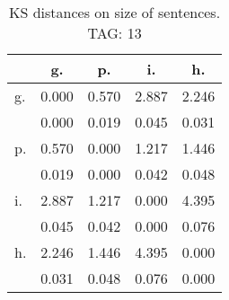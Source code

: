 \begin{table}[h!]
\begin{center}
\begin{tabular}{| l | c | c | c | c |}\hline
 & g. & p. & i. & h. \\\hline
g. & 0.000  & 0.570  & 2.887  & 2.246 \\\hline
 & 0.000  & 0.019  & 0.045  & 0.031 \\\hline
p. & 0.570  & 0.000  & 1.217  & 1.446 \\\hline
 & 0.019  & 0.000  & 0.042  & 0.048 \\\hline
i. & 2.887  & 1.217  & 0.000  & 4.395 \\\hline
 & 0.045  & 0.042  & 0.000  & 0.076 \\\hline
h. & 2.246  & 1.446  & 4.395  & 0.000 \\\hline
 & 0.031  & 0.048  & 0.076  & 0.000 \\\hline
\end{tabular}
\caption{KS distances on size of sentences. TAG: 13}
\end{center}
\end{table}